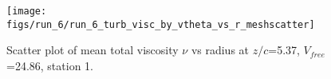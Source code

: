 \begin{figure}[H]
\centering
\texttt{[image: figs/run\_6/run\_6\_turb\_visc\_by\_vtheta\_vs\_r\_meshscatter]}
\caption{Scatter plot of mean total viscosity $\nu$ vs radius at $z/c$=5.37, $V_{free}$=24.86, station 1.}
\label{fig:run_6_turb_visc_by_vtheta_vs_r_meshscatter}
\end{figure}


